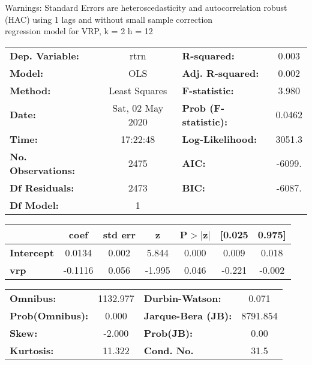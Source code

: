 Warnings: \newline
 [1] Standard Errors are heteroscedasticity and autocorrelation robust (HAC) using 1 lags and without small sample correction\\ 

regression model for VRP, k = 2 h = 12\begin{center}
\begin{tabular}{lclc}
\toprule
\textbf{Dep. Variable:}    &       rtrn       & \textbf{  R-squared:         } &     0.003   \\
\textbf{Model:}            &       OLS        & \textbf{  Adj. R-squared:    } &     0.002   \\
\textbf{Method:}           &  Least Squares   & \textbf{  F-statistic:       } &     3.980   \\
\textbf{Date:}             & Sat, 02 May 2020 & \textbf{  Prob (F-statistic):} &   0.0462    \\
\textbf{Time:}             &     17:22:48     & \textbf{  Log-Likelihood:    } &    3051.3   \\
\textbf{No. Observations:} &        2475      & \textbf{  AIC:               } &    -6099.   \\
\textbf{Df Residuals:}     &        2473      & \textbf{  BIC:               } &    -6087.   \\
\textbf{Df Model:}         &           1      & \textbf{                     } &             \\
\bottomrule
\end{tabular}
\begin{tabular}{lcccccc}
                   & \textbf{coef} & \textbf{std err} & \textbf{z} & \textbf{P$> |$z$|$} & \textbf{[0.025} & \textbf{0.975]}  \\
\midrule
\textbf{Intercept} &       0.0134  &        0.002     &     5.844  &         0.000        &        0.009    &        0.018     \\
\textbf{vrp}       &      -0.1116  &        0.056     &    -1.995  &         0.046        &       -0.221    &       -0.002     \\
\bottomrule
\end{tabular}
\begin{tabular}{lclc}
\textbf{Omnibus:}       & 1132.977 & \textbf{  Durbin-Watson:     } &    0.071  \\
\textbf{Prob(Omnibus):} &   0.000  & \textbf{  Jarque-Bera (JB):  } & 8791.854  \\
\textbf{Skew:}          &  -2.000  & \textbf{  Prob(JB):          } &     0.00  \\
\textbf{Kurtosis:}      &  11.322  & \textbf{  Cond. No.          } &     31.5  \\
\bottomrule
\end{tabular}
\end{center}

